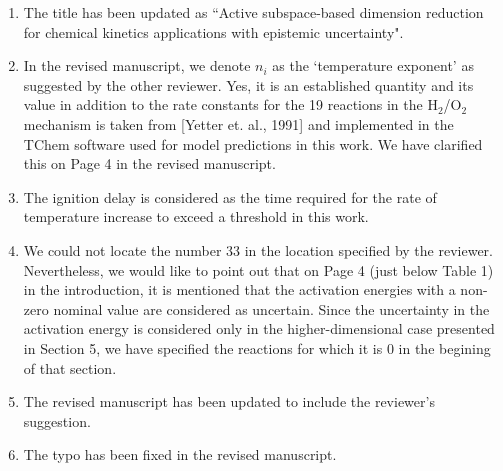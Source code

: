 \documentclass[11pt,final]{article}
\newcommand{\referee}[1]{\vspace{.1ex}\noindent{\textcolor{blue}{#1}}}
\begin{document}
\begin{enumerate}[wide, labelwidth=!, labelindent=0pt]
\item \referee{Why not use the word 'active' in the title, since active subspace is essentially
what has been done here?}

\noindent  The title has been updated as ``Active subspace-based dimension reduction for chemical kinetics
applications with epistemic uncertainty".

\item \referee{3.36 $n_i$ is index or power? Is this an established term for the power of T? 
Also, what are the values of $n_i$'s?}

\noindent  In the revised manuscript, we denote $n_i$ as the `temperature exponent' as suggested by
the other reviewer. Yes, it is an established quantity and its value in addition to the
rate constants for the 19 reactions
in the H$_2$/O$_2$ mechanism is taken from [Yetter et. al., 1991] and implemented in the
TChem software used for model predictions in this work. We have clarified this on Page 4
in the revised manuscript. 

\item \referee{3.51 'rate of temperature' or 'temperature'?}

\noindent  The ignition delay is considered as the time required for the rate of temperature increase to
exceed a threshold in this work.

\item \referee{4.57 not clear where the number 33 comes from since we have 19 reactions. I see it is explained at the beginning of Section 5, but it should be noted here briefly, too.}

\noindent  We could not locate the number 33 in the location specified by the reviewer. Nevertheless, we would like
to point out that on Page 4 (just below Table 1) in the introduction, 
it is mentioned that the activation energies with a non-zero nominal value are considered as uncertain. 
Since the uncertainty in the activation energy is considered only in the higher-dimensional case
presented in Section 5, we have
specified the reactions for which it is 0 in the begining of that section.

\item \referee{6.19 distribution->density function}

\noindent  The revised manuscript has been updated to include the reviewer's suggestion. 

\item \referee{6.38: typo, $w_r$ should be $w_1$}

\noindent  The typo has been fixed in the revised manuscript. 


\end{enumerate}
\end{document}
